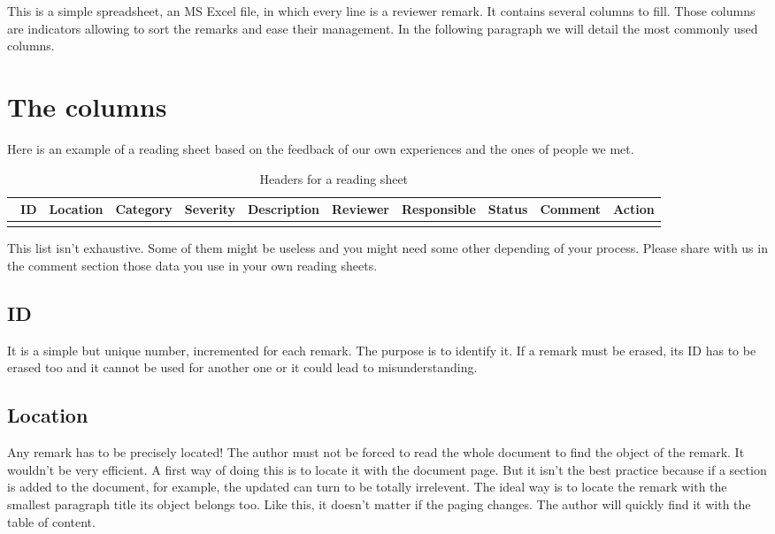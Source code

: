 This is a simple spreadsheet, an MS Excel file, in which every line is a reviewer remark. It contains several columns to fill. Those columns are indicators allowing to sort the remarks and ease their management. In the following paragraph we will detail the most commonly used columns.


\section{The columns}

Here is an example of a reading sheet based on the feedback of our own experiences and the ones of people we met.

\begin{table*}[h]
	\centering
		\begin{tabular}{|c|c|c|c|c|c|c|c|c|c|}
			\hline
			\ ID & Location & Category & Severity & Description & Reviewer & Responsible & Status & Comment & Action \\ 
			\hline
			&&&&&&&&&\\
		\end{tabular}
	\caption{Headers for a reading sheet}
	\label{tab:HeaderRS}
\end{table*}

This list isn’t exhaustive. Some of them might be useless and you might need some other depending of your process. Please share with us in the comment section those data you use in your own reading sheets.

\subsection{ID}
It is a simple but unique number, incremented for each remark. The purpose is to identify it. If a remark must be erased, its ID has to be erased too and it cannot be used for another one or it could lead to misunderstanding.

\subsection{Location}
Any remark has to be precisely located! The author must not be forced to read the whole document to find the object of the remark. It wouldn’t be very efficient.
A first way of doing this is to locate it with the document page. But it isn’t the best practice because if a section is added to the document, for example, the updated can turn to be totally irrelevent.
The ideal way is to locate the remark with the smallest paragraph title its object belongs too. Like this, it doesn’t matter if the paging changes. The author will quickly find it with the table of content.


